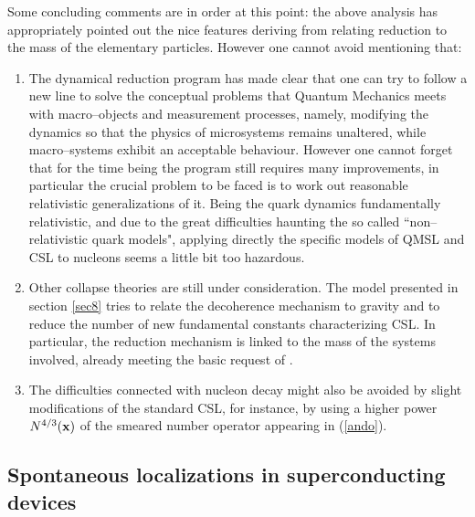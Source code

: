 \documentclass[12pt]{article}
\begin{document}
Some concluding comments are in order at this point: the above
analysis has appropriately pointed out the nice features deriving
from relating reduction to the mass of the elementary particles.
However one cannot avoid mentioning that:
\begin{enumerate}
\item The dynamical reduction program has made clear that one can
try to follow a new line to solve the conceptual problems that
Quantum Mechanics meets with macro--objects and measurement
processes, namely, modifying the dynamics so that the physics of
microsystems remains unaltered, while macro--systems exhibit an
acceptable behaviour. However one cannot forget that for the time
being the program still requires many improvements, in particular
the crucial problem to be faced is to work out reasonable
relativistic generalizations of it. Being the quark dynamics
fundamentally relativistic, and due to the great difficulties
haunting the so called ``non--relativistic quark models",
applying directly the specific models of QMSL and CSL to nucleons
seems a little bit too hazardous. \item Other collapse theories
are still under consideration. The model presented in section
\ref{sec8} tries to relate the decoherence mechanism to gravity
and to reduce the number of new fundamental constants
characterizing CSL. In particular, the reduction mechanism is
linked to the mass of the systems involved, already meeting the
basic request of \cite{pes}. \item The difficulties connected with
nucleon decay might also be avoided by slight modifications of the
standard CSL, for instance, by using a higher power $N^{4/3}({\bf
x})$ of the smeared number operator appearing in (\ref{ando}).
\end{enumerate}

\subsection[Superconducting devices]{Spontaneous localizations
in superconducting devices} \label{sec154}
\end{document}
